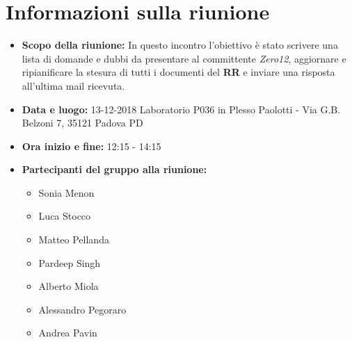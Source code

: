 \clearpage
\section{Informazioni sulla riunione}
\begin{itemize}
	\item \textbf {Scopo della riunione:} In questo incontro l'obiettivo è stato scrivere una lista di domande e dubbi da presentare al committente \emph{Zero12}, aggiornare e ripianificare la stesura di tutti i documenti del \textbf{RR} e inviare una risposta all'ultima mail ricevuta.
	
	\item \textbf {Data e luogo:} 13-12-2018 Laboratorio P036 in Plesso Paolotti - Via G.B. Belzoni 7, 35121 Padova PD
	
	\item \textbf {Ora inizio e fine:} 12:15 - 14:15
	
	\item \textbf {Partecipanti del gruppo alla riunione:} 
		 \begin{itemize}
			\item Sonia Menon
			\item Luca Stocco
			\item Matteo Pellanda
			\item Pardeep Singh
			\item Alberto Miola
			\item Alessandro Pegoraro
			\item Andrea Pavin
		\end{itemize}
\end{itemize}